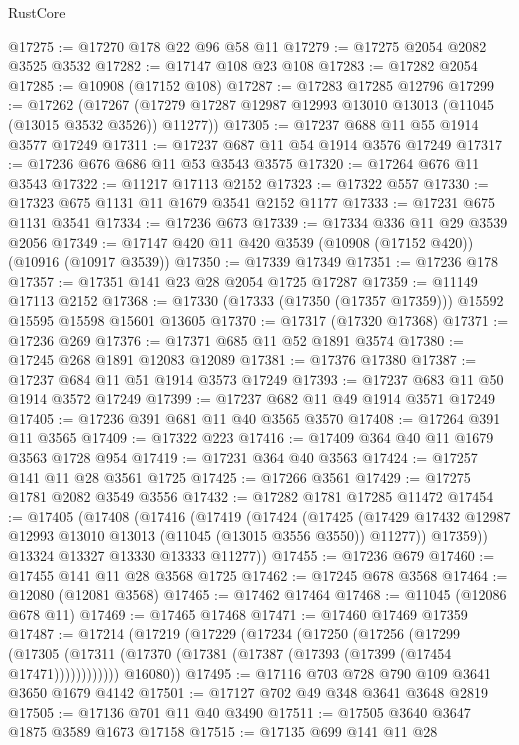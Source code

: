 \begin{lexlean}{RustCore}
\begin{coremodule}
@17275 := @17270 @178 @22 @96 @58 @11
@17279 := @17275 @2054 @2082 @3525 @3532
@17282 := @17147 @108 @23 @108
@17283 := @17282 @2054
@17285 := @10908 (@17152 @108)
@17287 := @17283 @17285 @12796
@17299 := @17262
    (@17267 (@17279 @17287 @12987 @12993 @13010 @13013 (@11045 (@13015 @3532 @3526)) @11277))
@17305 := @17237 @688 @11 @55 @1914 @3577 @17249
@17311 := @17237 @687 @11 @54 @1914 @3576 @17249
@17317 := @17236 @676 @686 @11 @53 @3543 @3575
@17320 := @17264 @676 @11 @3543
@17322 := @11217 @17113 @2152
@17323 := @17322 @557
@17330 := @17323 @675 @1131 @11 @1679 @3541 @2152 @1177
@17333 := @17231 @675 @1131 @3541
@17334 := @17236 @673
@17339 := @17334 @336 @11 @29 @3539 @2056
@17349 := @17147 @420 @11 @420 @3539 (@10908 (@17152 @420)) (@10916 (@10917 @3539))
@17350 := @17339 @17349
@17351 := @17236 @178
@17357 := @17351 @141 @23 @28 @2054 @1725 @17287
@17359 := @11149 @17113 @2152
@17368 := @17330 (@17333 (@17350 (@17357 @17359))) @15592 @15595 @15598 @15601 @13605
@17370 := @17317 (@17320 @17368)
@17371 := @17236 @269
@17376 := @17371 @685 @11 @52 @1891 @3574
@17380 := @17245 @268 @1891 @12083 @12089
@17381 := @17376 @17380
@17387 := @17237 @684 @11 @51 @1914 @3573 @17249
@17393 := @17237 @683 @11 @50 @1914 @3572 @17249
@17399 := @17237 @682 @11 @49 @1914 @3571 @17249
@17405 := @17236 @391 @681 @11 @40 @3565 @3570
@17408 := @17264 @391 @11 @3565
@17409 := @17322 @223
@17416 := @17409 @364 @40 @11 @1679 @3563 @1728 @954
@17419 := @17231 @364 @40 @3563
@17424 := @17257 @141 @11 @28 @3561 @1725
@17425 := @17266 @3561
@17429 := @17275 @1781 @2082 @3549 @3556
@17432 := @17282 @1781 @17285 @11472
@17454 := @17405
    (@17408
      (@17416
        (@17419
          (@17424
            (@17425
              (@17429 @17432 @12987 @12993 @13010 @13013 (@11045 (@13015 @3556 @3550)) @11277))
            @17359))
        @13324
        @13327
        @13330
        @13333
        @11277))
@17455 := @17236 @679
@17460 := @17455 @141 @11 @28 @3568 @1725
@17462 := @17245 @678 @3568
@17464 := @12080 (@12081 @3568)
@17465 := @17462 @17464
@17468 := @11045 (@12086 @678 @11)
@17469 := @17465 @17468
@17471 := @17460 @17469 @17359
@17487 := @17214
    (@17219
      (@17229
        (@17234
          (@17250
            (@17256
              (@17299
                (@17305 (@17311 (@17370 (@17381 (@17387 (@17393 (@17399 (@17454 @17471))))))))))))
        @16080))
@17495 := @17116 @703 @728 @790 @109 @3641 @3650 @1679 @4142
@17501 := @17127 @702 @49 @348 @3641 @3648 @2819
@17505 := @17136 @701 @11 @40 @3490
@17511 := @17505 @3640 @3647 @1875 @3589 @1673 @17158
@17515 := @17135 @699 @141 @11 @28

\end{coremodule}
\end{lexlean}
